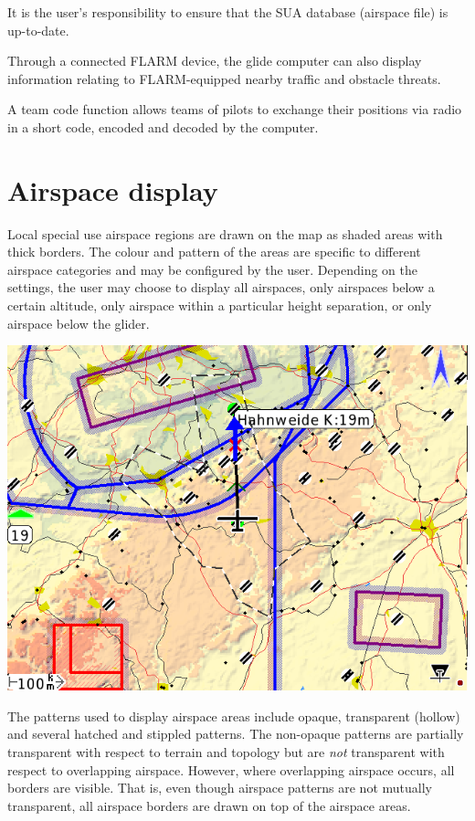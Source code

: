 \documentclass[a4paper,12pt]{refrep}
\begin{document}
It is the user's responsibility to ensure that the SUA database
(air\-space file) is up-to-date.

Through a connected FLARM device, the glide computer can also
display information relating to FLARM-equipped nearby traffic
and obstacle threats.

A team code function allows teams of pilots to exchange their
positions via radio in a short code, encoded and decoded by the
computer.

\section{Airspace display}

Local special use airspace regions are drawn on the map as shaded
areas with thick borders.  The colour and pattern of the areas are
specific to different airspace categories and may be configured by the
user.  Depending on the settings, the user may choose to display all
airspaces, only airspaces below a certain altitude, only airspace within a
particular height separation, or only airspace below the glider.

\begin{center}
\includegraphics[angle=0,width=0.8\linewidth,keepaspectratio='true']{figures/airspace.png}
\end{center}

The patterns used to display airspace areas include opaque,
transparent (hollow) and several hatched and stippled patterns.  The
non-opaque patterns are partially transparent with respect to terrain
and topology but are {\em not} transparent with respect to overlapping
airspace.  However, where overlapping airspace occurs, all borders are
visible.  That is, even though airspace patterns are not mutually
transparent, all airspace borders are drawn on top of the airspace
areas.
\end{document}
